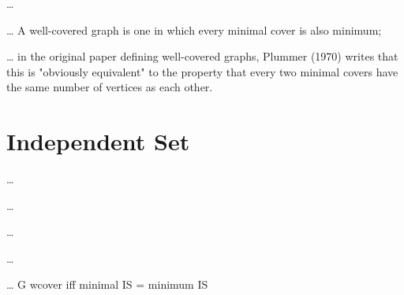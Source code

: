 
\begin{problem}
  \ldots{}
\end{problem}


\begin{definition}
  \label{def:well_covered}
  \ldots{}
  A well-covered graph is one in which every minimal cover is also minimum; 
  \cite{graph_well_covered}
\end{definition}


\begin{theorem}
  \ldots{}
  in the original paper defining well-covered graphs, Plummer (1970) writes that this is "obviously equivalent" to the property that every two minimal covers have the same number of vertices as each other.
\end{theorem}

\section{Independent Set}


\begin{definition}
  \ldots{}
\end{definition}


\begin{definition}
  \ldots{}
\end{definition}


\begin{definition}
  \ldots{}
\end{definition}


\begin{problem}
  \ldots{}
\end{problem}


\begin{theorem}
  \ldots{}
  G \gls{wcover} iff minimal IS = minimum IS
\end{theorem}

